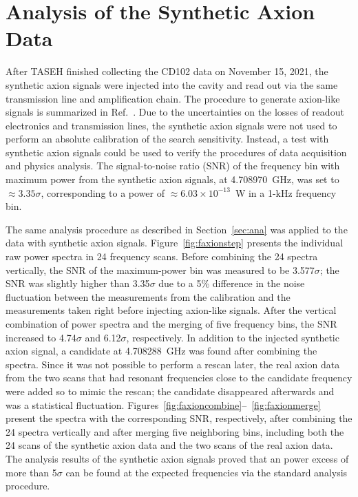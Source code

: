 \section{Analysis of the Synthetic Axion Data}\label{sec:faxion}
After TASEH finished collecting the CD102 data on November 15, 2021, 
the synthetic axion signals were injected into the cavity and read out via the 
same transmission line and amplification chain. The procedure 
to generate axion-like signals is summarized in 
Ref.~\cite{TASEHInstrumentation}. 
Due to the uncertainties on the losses of readout electronics and transmission
 lines, the synthetic axion signals were not used to perform an absolute 
calibration of the search sensitivity. Instead, 
a test with synthetic axion signals could be used to verify the procedures of 
data acquisition and physics analysis. The 
signal-to-noise ratio (SNR) of the frequency bin with maximum power from the 
synthetic axion signals, at 4.708970~GHz, was set to $\approx 3.35\sigma$, 
corresponding to a power of $\approx 6.03 \times 10^{-13}$~W in a 1-kHz 
frequency bin.  

The same analysis procedure as described in Section~\ref{sec:ana} was applied 
to the data with synthetic axion signals. 
Figure~\ref{fig:faxionstep} presents the individual raw power spectra in 
24 frequency scans. Before combining 
the 24 spectra vertically, the SNR of the maximum-power bin was measured to be 
3.577$\sigma$; the SNR was slightly higher than 3.35$\sigma$ due to a 
5\% difference in the noise fluctuation between the measurements from 
the calibration and the measurements taken 
right before injecting axion-like signals. After the vertical combination 
of power spectra and the merging of five frequency bins, the SNR increased to 
4.74$\sigma$ and 6.12$\sigma$, respectively. In addition to the 
injected synthetic axion signal, a candidate at 4.708288~GHz was found after 
combining the spectra. Since it was not possible to perform a rescan later, 
the real axion data from the two scans that had resonant frequencies close to 
the candidate frequency were added so to mimic the rescan; the candidate 
 disappeared afterwards and was a statistical fluctuation.  
Figures~\ref{fig:faxioncombine}--~\ref{fig:faxionmerge} present 
the spectra with the corresponding SNR, respectively, after combining the 24 
spectra vertically and after merging five neighboring bins, 
including both the 24 scans of the synthetic axion data and the two scans 
of the real axion data. 
The analysis results of the synthetic axion signals proved that an power 
excess of more than 5$\sigma$ can be found at the expected frequencies via 
the standard analysis procedure.  

